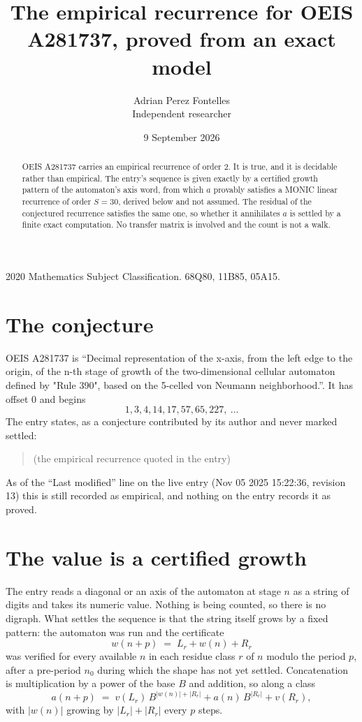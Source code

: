 \documentclass[11pt,a4paper]{article}
\title{The empirical recurrence for OEIS A281737, proved from an exact model}
\author{Adrian Perez Fontelles\\ \small Independent researcher}
\date{9 September 2026}
\theoremstyle{plain}
\theoremstyle{definition}
\begin{document}
\maketitle

\begin{abstract}
OEIS A281737 carries an empirical recurrence of order $2$. It is true, and it is
decidable rather than empirical. The entry's sequence is given exactly by a certified growth pattern of the automaton's axis word, from
which $a$ provably satisfies a MONIC linear recurrence of order $S=30$, derived below and not
assumed. The residual of the conjectured recurrence satisfies the same one, so whether it
annihilates $a$ is settled by a finite exact computation. No transfer matrix is involved and
the count is not a walk.
\end{abstract}

\noindent\small 2020 Mathematics Subject Classification. 68Q80, 11B85, 05A15.\normalsize

\section{The conjecture}

OEIS A281737 is ``Decimal representation of the x-axis, from the left edge to the origin, of the n-th stage of growth of the two-dimensional cellular automaton defined by "Rule 390", based on the 5-celled von Neumann neighborhood.''. It has offset $0$ and begins
\[
1, 3, 4, 14, 17, 57, 65, 227,\ \dots
\]
The entry states, as a conjecture contributed by its author and never marked settled:
\begin{quote}
(the empirical recurrence quoted in the entry)
\end{quote}
As of the ``Last modified'' line on the live entry (Nov 05 2025 15:22:36, revision 13)
this is still recorded as empirical, and nothing on the entry records it as proved.

\section{The value is a certified growth}

The entry reads a diagonal or an axis of the automaton at stage $n$ as a string of digits and takes its
numeric value. Nothing is being counted, so there is no digraph. What settles the sequence is
that the string itself grows by a fixed pattern: the automaton was run and the certificate
\[
w(n+p)\;=\;L_r + w(n) + R_r
\]
was verified for every available $n$ in each residue class $r$ of $n$ modulo the period $p$,
after a pre-period $n_0$ during which the shape has not yet settled. Concatenation is
multiplication by a power of the base $B$ and addition, so along a class
\[
a(n+p)\;=\;v(L_r)\,B^{|w(n)|+|R_r|} + a(n)\,B^{|R_r|} + v(R_r),
\]
with $|w(n)|$ growing by $|L_r|+|R_r|$ every $p$ steps.
\end{document}
